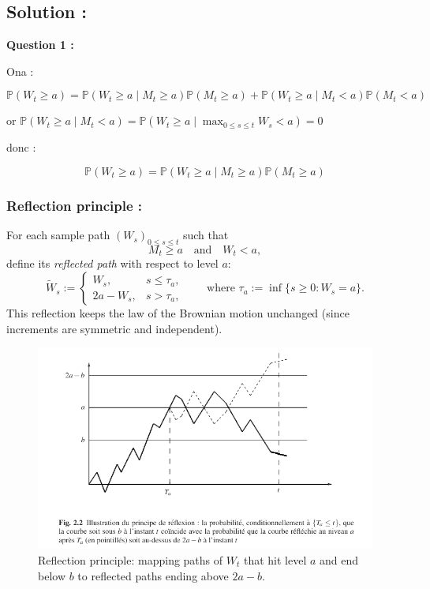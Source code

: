 \subsection*{Solution :}

\textbf{Question 1 : }

Ona : 

\[
\mathbb{P}(W_t \ge a) =\mathbb{P}(W_t \ge a \mid M_t \ge a)\mathbb{P}(M_t \ge a) + \mathbb{P}(W_t \ge a \mid M_t < a)\mathbb{P}(M_t < a)
\]


or  $\mathbb{P}(W_t \ge a \mid M_t < a) = \mathbb{P}(W_t \ge a \mid \max_{0 \le s \le t} W_s < a) = 0$

donc : 

\[
\mathbb{P}(W_t \ge a) =\mathbb{P}(W_t \ge a \mid M_t \ge a)\mathbb{P}(M_t \ge a)
\]

\subsubsection*{Reflection principle :}

For each sample path \( (W_s)_{0 \le s \le t} \) such that
\[
M_t \ge a \quad \text{and} \quad W_t < a,
\]
define its \emph{reflected path} with respect to level \(a\):
\[
\widetilde{W}_s :=
\begin{cases}
W_s, & s \le \tau_a,\\[3pt]
2a - W_s, & s > \tau_a,
\end{cases}
\qquad
\text{where } \tau_a := \inf\{ s \ge 0 : W_s = a \}.
\]
This reflection keeps the law of the Brownian motion unchanged (since increments are symmetric and independent).

\begin{figure}[h]
    \centering
    \includegraphics[width=0.75\linewidth]{01_math/03_chapter_calcul_stochastique/reflexion_bm.png}
    \caption{Reflection principle: mapping paths of $W_t$ that hit level $a$ and end below $b$ to reflected paths ending above $2a - b$.}
    \label{fig:placeholder}
\end{figure}


